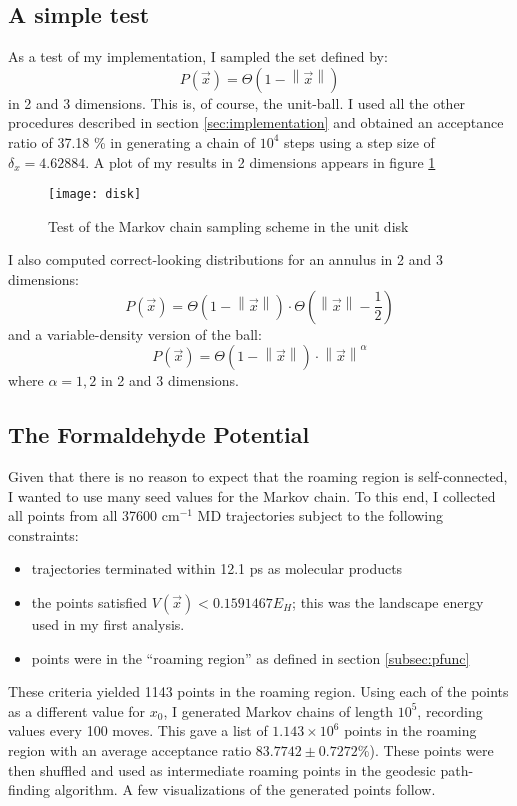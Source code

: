\documentclass[letterpaper,12pt]{article}
\newcommand{\norm}[1]{\left\lVert#1\right\rVert}
\begin{document}
\subsection{A simple test}
As a test of my implementation, I sampled the set defined by:
\begin{equation}
P(\vec{x}) = \Theta(1 - \norm{\vec{x}})
\end{equation}
in 2 and 3 dimensions. This is, of course, the unit-ball. I used all the other procedures described in section \ref{sec:implementation} and obtained an acceptance ratio of 37.18 \% in generating a chain of $10^4$ steps using a step size of $\delta_x = 4.62884$. A plot of my results in 2 dimensions appears in figure \ref{fig:disk}

\begin{figure}
\begin{center}
\texttt{[image: disk]}
\caption{Test of the Markov chain sampling scheme in the unit disk}{\label{fig:disk}}
\end{center}
\end{figure}

I also computed correct-looking distributions for an annulus in 2 and 3 dimensions:
\begin{equation}
P(\vec{x}) = \Theta \left(1 - \norm{\vec{x}} \right) \cdot \Theta \left(\norm{\vec{x}} - \frac{1}{2} \right)
\end{equation} 
and a variable-density version of the ball:
\begin{equation}
P(\vec{x}) = \Theta(1 - \norm{\vec{x}}) \cdot \norm{\vec{x}}^{\alpha}
\end{equation}
where $\alpha=1,2$ in 2 and 3 dimensions.

\FloatBarrier

\subsection{The Formaldehyde Potential}
Given that there is no reason to expect that the roaming region is self-connected, I wanted to use many seed values for the Markov chain. To this end, I collected all points from all 37600 cm$^{-1}$ MD trajectories subject to the following constraints:
\begin{itemize}
\item trajectories terminated within 12.1 ps as molecular products
\item the points satisfied $V(\vec{x}) < 0.1591467 E_H$; this was the landscape energy used in my first analysis.
\item points were in the ``roaming region'' as defined in section \ref{subsec:pfunc}
\end{itemize}
These criteria yielded 1143 points in the roaming region. Using each of the points as a different value for $x_0$, I generated Markov chains of length $10^5$, recording values every 100 moves. This gave a list of $1.143 \times 10^6$ points in the roaming region with an average acceptance ratio  $83.7742 \pm 0.7272 \%$). These points were then shuffled and used as intermediate roaming points in the geodesic path-finding algorithm. A few visualizations of the generated points follow.
\end{document}
